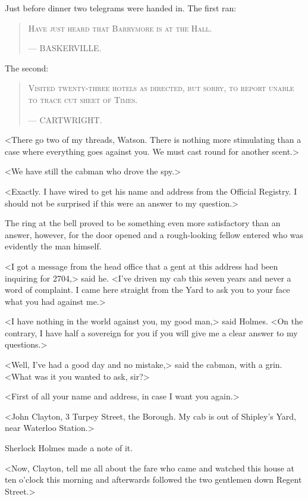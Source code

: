 Just before dinner two telegrams were handed in. The first ran:
\begin{samepage}
\blockquote{
\textsc{Have just heard that Barrymore is at the Hall.}
\begin{flushright}
— {\small\scshape BASKERVILLE\@.}
\end{flushright} 
}
\end{samepage}

The second:
\begin{samepage}
\blockquote{
\textsc{Visited twenty-three hotels as directed, but sorry, to report unable to trace cut sheet of Times.}
\begin{flushright}
— {\small\scshape CARTWRIGHT\@.}
\end{flushright}
}
\end{samepage}

<There go two of my threads, Watson. There is nothing more stimulating than a case where everything goes against you. We must cast round for another scent.>

<We have still the cabman who drove the spy.>

<Exactly. I have wired to get his name and address from the Official Registry. I should not be surprised if this were an answer to my question.>

The ring at the bell proved to be something even more satisfactory than an answer, however, for the door opened and a rough-looking fellow entered who was evidently the man himself.

<I got a message from the head office that a gent at this address had been inquiring for 2704,> said he. <I've driven my cab this seven years and never a word of complaint. I came here straight from the Yard to ask you to your face what you had against me.>

<I have nothing in the world against you, my good man,> said Holmes. <On the contrary, I have half a sovereign for you if you will give me a clear answer to my questions.>

<Well, I've had a good day and no mistake,> said the cabman, with a grin. <What was it you wanted to ask, sir?>

<First of all your name and address, in case I want you again.>

<John Clayton, 3 Turpey Street, the Borough. My cab is out of Shipley's Yard, near Waterloo Station.>

Sherlock Holmes made a note of it.

<Now, Clayton, tell me all about the fare who came and watched this house at ten o'clock this morning and afterwards followed the two gentlemen down Regent Street.>

